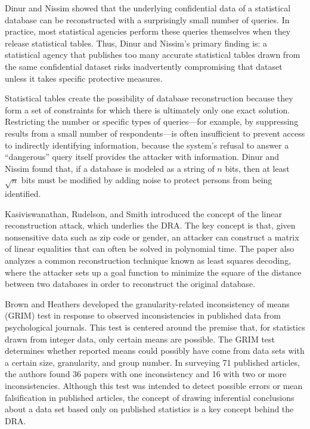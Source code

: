 \documentclass[runningheads]{llncs}
\begin{document}
Dinur and Nissim\cite{noise} showed that the underlying
confidential data of a statistical database can be reconstructed with
a surprisingly small number of queries. In practice, most statistical
agencies perform these queries themselves when they release
statistical tables. Thus, Dinur and Nissim's primary finding
is: a statistical agency that publishes too many accurate statistical
tables drawn from the same confidential dataset risks inadvertently
compromising that dataset unless it takes specific protective measures.

Statistical tables create the possibility of database reconstruction
because they form a set of constraints for which there is ultimately
only one exact solution. Restricting
the number or specific types of queries---for example, by suppressing
results from a small number of respondents---is often insufficient to prevent access
to indirectly identifying information, because the system's refusal to
answer a ``dangerous'' query itself provides the attacker with information. 
Dinur and Nissim found that, if a database is modeled as a string of $n$ bits,
then at least $\sqrt{n}$ bits must be modified by adding noise to
protect persons from being identified.

Kasiviswanathan, Rudelson, and Smith\cite{Kasiviswanathan:2013:PLR:2627817.2627919} introduced
the concept of the linear reconstruction attack, which underlies the  DRA. The key concept is that,
given nonsensitive data such as zip code or gender, an attacker
can construct a matrix of linear equalities that can often be solved
in polynomial time. The paper also analyzes a common reconstruction
technique known as least squares decoding, where the attacker sets up
a goal function to minimize the square of the distance between two
databases in order to reconstruct the original database.

Brown and Heathers\cite{doi:10.1177/1948550616673876} developed the
granularity-related inconsistency of means (GRIM) test in response to
observed inconsistencies in published data from psychological
journals. This test is centered around the premise that, for
statistics drawn from integer data, only certain means are
possible. The GRIM test determines whether reported means could
possibly have come from data sets with a certain size, granularity,
and group number. In surveying 71 published articles, the authors
found 36 papers with one inconsistency and 16 with two or more
inconsistencies. Although this test was intended to detect possible
errors or mean falsification in published articles, the concept of
drawing inferential conclusions about a data set based only on 
published statistics is a key concept behind the DRA.
\end{document}
